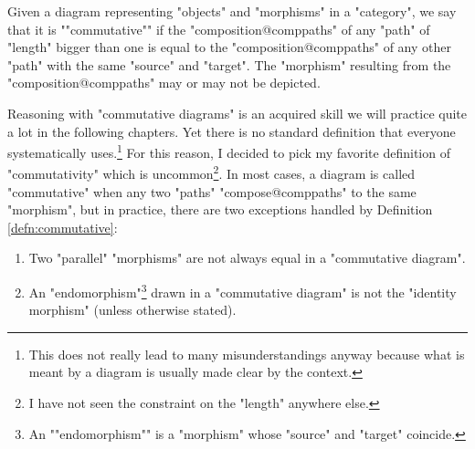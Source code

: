 \documentclass[main.tex]{subfiles}
\begin{document}
\begin{defn}[Commutativity]\label{defn:commutative}
	\AP Given a diagram representing "objects" and "morphisms" in a "category", we say that it is ""commutative"" if the "composition@comppaths" of any "path" of "length" bigger than one is equal to the "composition@comppaths" of any other "path" with the same "source" and "target". The "morphism" resulting from the "composition@comppaths" may or may not be depicted.
\end{defn}
\begin{rem}[Convention]
	Reasoning with "commutative diagrams" is an acquired skill we will practice quite a lot in the following chapters. Yet there is no standard definition that everyone systematically uses.\footnote{This does not really lead to many misunderstandings anyway because what is meant by a diagram is usually made clear by the context.} For this reason, I decided to pick my favorite definition of "commutativity" which is uncommon\footnote{I have not seen the constraint on the "length" anywhere else.}. In most cases, a diagram is called "commutative" when any two "paths" "compose@comppaths" to the same "morphism", but in practice, there are two exceptions handled by Definition \ref{defn:commutative}:
	\begin{enumerate}
		\item Two "parallel" "morphisms" are not always equal in a "commutative diagram".
		\item An "endomorphism"\footnote{\AP An ""endomorphism"" is a "morphism" whose "source" and "target" coincide.} drawn in a "commutative diagram" is not the "identity morphism" (unless otherwise stated).
	\end{enumerate}
\end{rem}
\end{document}
